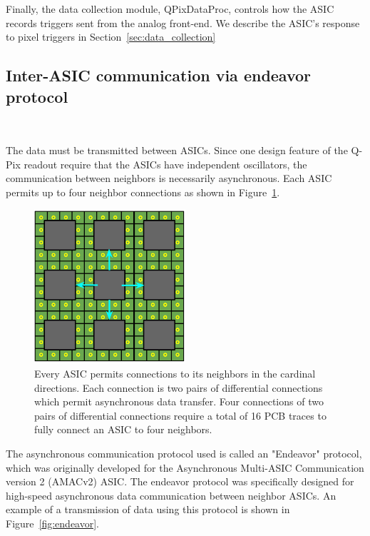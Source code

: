 Finally, the data collection module, QPixDataProc, controls how the ASIC records triggers sent from the analog front-end.
We describe the ASIC's response to pixel triggers in Section~\ref{sec:data_collection}


\subsection{Inter-ASIC communication via endeavor protocol}~\label{sec:endeavor}

The data must be transmitted between ASICs.
Since one design feature of the Q-Pix readout require that the ASICs have independent oscillators, the communication between neighbors is necessarily asynchronous.
Each ASIC permits up to four neighbor connections as shown in Figure~\ref{fig:example_connections}.


\begin{figure}[]
\centering
\includegraphics[width=0.5\textwidth]{images/asic_neighbor_connections_qpix.png}
\caption{Every ASIC permits connections to its neighbors in the cardinal directions.
Each connection is two pairs of differential connections which permit asynchronous data transfer.
Four connections of two pairs of differential connections require a total of 16 PCB traces to fully connect an ASIC to four neighbors.
}
\label{fig:example_connections}
\end{figure}

The asynchronous communication protocol used is called an "Endeavor" protocol, which was originally developed for the Asynchronous Multi-ASIC Communication version 2 (AMACv2) ASIC.
The endeavor protocol was specifically designed for high-speed asynchronous data communication between neighbor ASICs.
An example of a transmission of data using this protocol is shown in Figure~\ref{fig:endeavor}.


